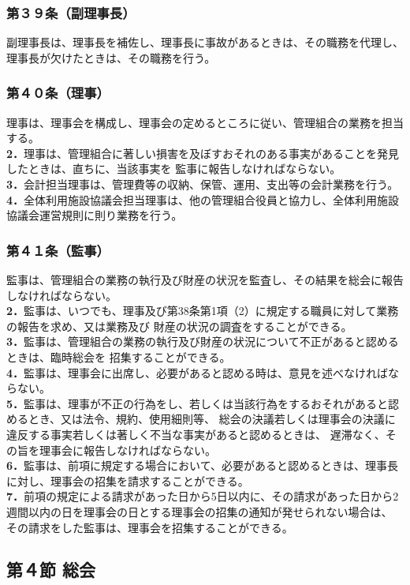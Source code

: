 \documentclass[12pt,uplatex,dvipdfmx]{jsarticle}
\begin{document}
\subsubsection*{第３９条（副理事長）}
副理事長は、理事長を補佐し、理事長に事故があるときは、その職務を代理し、理事長が欠けたときは、その職務を行う。
\subsubsection*{第４０条（理事）}
理事は、理事会を構成し、理事会の定めるところに従い、管理組合の業務を担当する。\\
\textbf{2．}理事は、管理組合に著しい損害を及ぼすおそれのある事実があることを発見したときは、直ちに、当該事実を
監事に報告しなければならない。\\
\textbf{3．}会計担当理事は、管理費等の収納、保管、運用、支出等の会計業務を行う。\\
\textbf{4．}全体利用施設協議会担当理事は、他の管理組合役員と協力し、全体利用施設協議会運営規則に則り業務を行う。
\subsubsection*{第４１条（監事）}
監事は、管理組合の業務の執行及び財産の状況を監査し、その結果を総会に報告しなければならない。\\
\textbf{2．}監事は、いつでも、理事及び第38条第1項（2）に規定する職員に対して業務の報告を求め、又は業務及び
財産の状況の調査をすることができる。\\
\textbf{3．}監事は、管理組合の業務の執行及び財産の状況について不正があると認めるときは、臨時総会を
招集することができる。\\
\textbf{4．}監事は、理事会に出席し、必要があると認める時は、意見を述べなければならない。\\
\textbf{5．}監事は、理事が不正の行為をし、若しくは当該行為をするおそれがあると認めるとき、又は法令、規約、使用細則等、
総会の決議若しくは理事会の決議に違反する事実若しくは著しく不当な事実があると認めるときは、 遅滞なく、その旨を理事会に報告しなければならない。\\
\textbf{6．}監事は、前項に規定する場合において、必要があると認めるときは、理事長に対し、理事会の招集を請求することができる。\\
\textbf{7．}前項の規定による請求があった日から5日以内に、その請求があった日から2週間以内の日を理事会の日とする理事会の招集の通知が発せられない場合は、
その請求をした監事は、理事会を招集することができる。
\begin{center}
\subsection*{第４節 総会}
\end{center}
\end{document}

